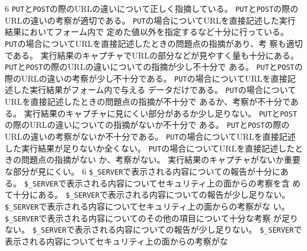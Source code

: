 \ProblemNN{

\ \vspace{0.1\textheight}

\ \vspace{0.1\textheight}
\\[0.05\textheight]
\ \Newpage

\ \vspace{0.2\textheight}

}
{
{}{6}
{
{\texttt{PUT}と\texttt{POST}の際のURLの違いについて正しく指摘している。}
{\texttt{PUT}と\texttt{POST}の際のURLの違いの考察が適切である。}
{\texttt{PUT}の場合についてURLを直接記述した実行結果においてフォーム内で
定めた値以外を指定するなど十分に行っている。}
{\texttt{PUT}の場合についてURLを直接記述したときの問題点の指摘があり、考
察も適切である。}
{実行結果のキャプチャでURLの部分などが見やすく量も十分にある。}
}
{
{\texttt{PUT}と\texttt{POST}の際のURLの違いについての指摘が少し不十分で
ある。}
{\texttt{PUT}と\texttt{POST}の際のURLの違いの考察が少し不十分である。}
{\texttt{PUT}の場合についてURLを直接記述した実行結果がフォーム内で与える
データだけである。}
{\texttt{PUT}の場合についてURLを直接記述したときの問題点の指摘が不十分で
あるか、考察が不十分である。}
{実行結果のキャプチャに見にくい部分があるか少し足りない。}
}
{
{\texttt{PUT}と\texttt{POST}の際のURLの違いについての指摘がないか不十分で
ある。}
{\texttt{PUT}と\texttt{POST}の際のURLの違いの考察がないか不十分である。}
{\texttt{PUT}の場合についてURLを直接記述した実行結果が足りないか全くない。}
{\texttt{PUT}の場合についてURLを直接記述したときの問題点の指摘がない
か、考察がない。}
{実行結果のキャプチャがないか重要な部分が見にくい。}
}
{}{6}
{
{\texttt{\$\_SERVER}で表示される内容についての報告が十分にある。}
{\texttt{\$\_SERVER}で表示される内容についてセキュリティ上の面からの考察を含
めて十分にある。}
}
{
{\texttt{\$\_SERVER}で表示される内容についての報告が少し足りない。}
{\texttt{\$\_SERVER}で表示される内容についてセキュリティ上の面からの考察がな
い。}
{\texttt{\$\_SERVER}で表示される内容についてのその他の項目について十分な考察
が足りない。}
}
{
{\texttt{\$\_SERVER}で表示される内容についての報告が少し足りない。}
{\texttt{\$\_SERVER}で表示される内容についてセキュリティ上の面からの考察がな
}}}
